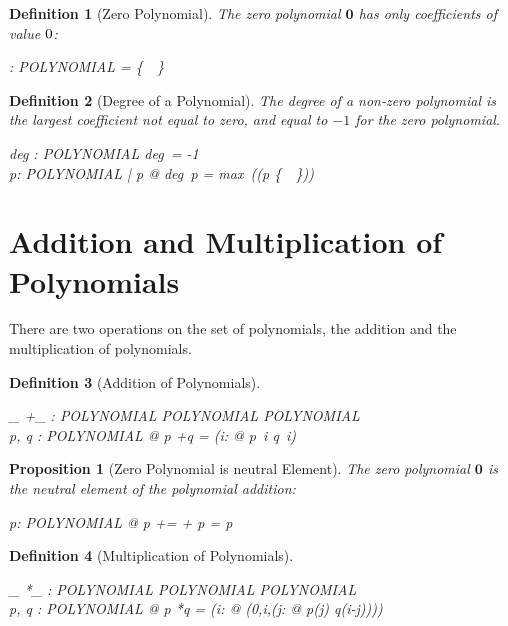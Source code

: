 \documentclass[12pt]{scrartcl}
\newtheorem{prop}{Proposition}[section]
\newtheorem{zdef}{Definition}[section]
\begin{document}
\newcommand{\zeropol}{\mathbf{0}}
\begin{zdef}[Zero Polynomial]
  \label{zdef:zero-polynomial}
  The \emph{zero polynomial} $\zeropol$ has only coefficients of value
  $0$:
  \begin{axdef}
    \zeropol : POLYNOMIAL
    \where
    \ran \zeropol = \{~\azero~\}
  \end{axdef}
\end{zdef}

\begin{zdef}[Degree of a Polynomial]
  The degree of a non-zero polynomial is the largest coefficient not equal to
  zero, and equal to $-1$ for the zero polynomial.
  \label{zdef:degree}
  \begin{axdef}
    deg : POLYNOMIAL \fun \nat
    \where
    deg~\zeropol = -1 \\
    \forall p: POLYNOMIAL | p \neq \zeropol @ deg~p = max~(\dom (p \nrres
  \{~\azero~\}))\\
  \end{axdef}
\end{zdef}

\section{Addition and Multiplication of Polynomials}
\label{sec:addition-multiplication}
There are two operations on the set of polynomials, the addition and
the multiplication of polynomials.
\newcommand{\polyplus}{+}
\begin{zdef}[Addition of Polynomials]
  \label{zdef:polynomial-addition}
  \begin{axdef}
    \_ \polyplus \_ : POLYNOMIAL \cross POLYNOMIAL \fun POLYNOMIAL\\
    \where
    \forall p, q : POLYNOMIAL @ p \polyplus q = (\lambda i: \nat @ p~i
    \aplus q~i)
  \end{axdef}
\end{zdef}

\begin{prop}[Zero Polynomial is neutral Element]
  \label{prop:zero-polynomial-neutral-element}
  The zero polynomial $\zeropol$ is the neutral element of the
  polynomial addition:
  \begin{zed}
    \forall p: POLYNOMIAL @ p \polyplus \zeropol = \zeropol \polyplus
    p = p
  \end{zed}
\end{prop}

\newcommand{\polymult}{*}
\begin{zdef}[Multiplication of Polynomials]
  \label{zdef:polynomial-multiplication}
  \begin{axdef}
    \_ \polymult \_ : POLYNOMIAL \cross POLYNOMIAL \fun POLYNOMIAL\\
    \where
    \forall p, q : POLYNOMIAL @ p \polymult q = (\lambda i: \nat @
    \finsum(0,i,(\lambda j: \nat @ p(j) \amult q(i-j))))
  \end{axdef}
\end{zdef}
\end{document}
